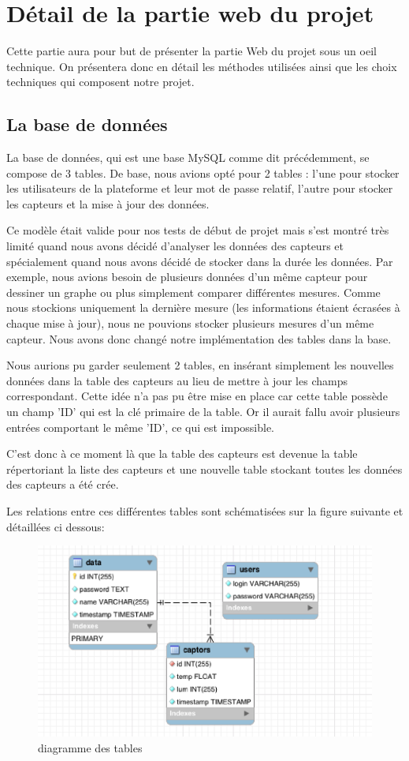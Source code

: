 \section{Détail de la partie web du projet}
\par
Cette partie aura pour but de présenter la partie Web du projet sous un oeil technique. On présentera donc en détail les méthodes utilisées ainsi que les choix techniques qui composent notre projet.
	\subsection{La base de données}
	\par
	La base de données, qui est une base MySQL comme dit précédemment, se compose de 3 tables. De base, nous avions opté pour 2 tables : l'une pour stocker les utilisateurs de la plateforme et leur mot de passe relatif, l'autre pour stocker les capteurs et la mise à jour des données.
	\par
	Ce modèle était valide pour nos tests de début de projet mais s'est montré très limité quand nous avons décidé d'analyser les données des capteurs et spécialement quand nous avons décidé de stocker dans la durée les données. Par exemple, nous avions besoin de plusieurs données d'un même capteur pour dessiner un graphe ou plus simplement comparer différentes mesures.
	Comme nous stockions uniquement la dernière mesure (les informations étaient écrasées à chaque mise à jour), nous ne pouvions stocker plusieurs mesures d'un même capteur. Nous avons donc changé notre implémentation des tables dans la base.
	\par
	Nous aurions pu garder seulement 2 tables, en insérant simplement les nouvelles données dans la table des capteurs au lieu de mettre à jour les champs correspondant. Cette idée n'a pas pu être mise en place car cette table possède un champ 'ID' qui est la clé primaire de la table. Or il aurait fallu avoir plusieurs entrées comportant le même 'ID', ce qui est impossible.
	\par
	C'est donc à ce moment là que la table des capteurs est devenue la table répertoriant la liste des capteurs et une nouvelle table stockant toutes les données des capteurs a été crée.
	\par
	Les relations entre ces différentes tables sont schématisées sur la figure suivante et détaillées ci dessous:
	 \begin{figure}[h]
  		\centering
    		\includegraphics[scale=0.5]{diagramme_tables.eps}
		\caption {diagramme des tables}
	\end{figure}
